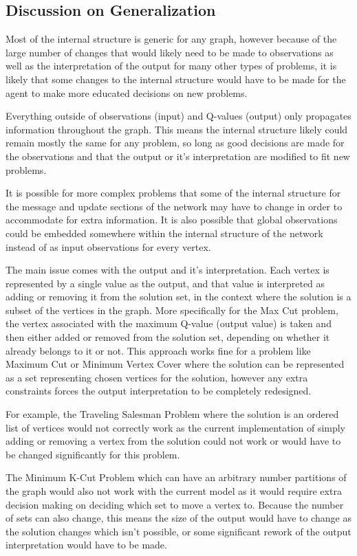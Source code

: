 \documentclass{article}
\begin{document}
\subsection{Discussion on Generalization}

Most of the internal structure is generic for any graph, however because of the large number of changes that would likely need to be made to observations as well as the interpretation of the output for many other types of problems, it is likely that some changes to the internal structure would have to be made for the agent to make more educated decisions on new problems.

Everything outside of observations (input) and Q-values (output) only propagates information throughout the graph. This means the internal structure likely could remain mostly the same for any problem, so long as good decisions are made for the observations and that the output or it's interpretation are modified to fit new problems.

It is possible for more complex problems that some of the internal structure for the message and update sections of the network may have to change in order to accommodate for extra information. It is also possible that global observations could be embedded somewhere within the internal structure of the network instead of as input observations for every vertex.

The main issue comes with the output and it's interpretation. Each vertex is represented by a single value as the output, and that value is interpreted as adding or removing it from the solution set, in the context where the solution is a subset of the vertices in the graph. More specifically for the Max Cut problem, the vertex associated with the maximum Q-value (output value) is taken and then either added or removed from the solution set, depending on whether it already belongs to it or not. This approach works fine for a problem like Maximum Cut or Minimum Vertex Cover where the solution can be represented as a set representing chosen vertices for the solution, however any extra constraints forces the output interpretation to be completely redesigned. 

For example, the Traveling Salesman Problem where the solution is an ordered list of vertices would not correctly work as the current implementation of simply adding or removing a vertex from the solution could not work or would have to be changed significantly for this problem.

The Minimum K-Cut Problem which can have an arbitrary number partitions of the graph would also not work with the current model as it would require extra decision making on deciding which set to move a vertex to. Because the number of sets can also change, this means the size of the output would have to change as the solution changes which isn't possible, or some significant rework of the output interpretation would have to be made.
\end{document}
